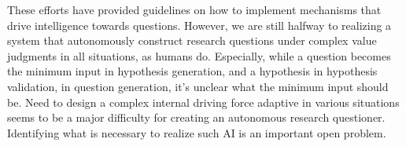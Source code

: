 These efforts have provided guidelines on how to implement mechanisms that drive intelligence towards questions. However, we are still halfway to realizing a system that autonomously construct research questions under complex value judgments in all situations, as humans do. Especially, while a question becomes the minimum input in hypothesis generation, and a hypothesis in hypothesis validation, in question generation, it's unclear what the minimum input should be. Need to design a complex internal driving force adaptive in various situations seems to be a major difficulty for creating an autonomous research questioner. Identifying what is necessary to realize such AI is an important open problem.



